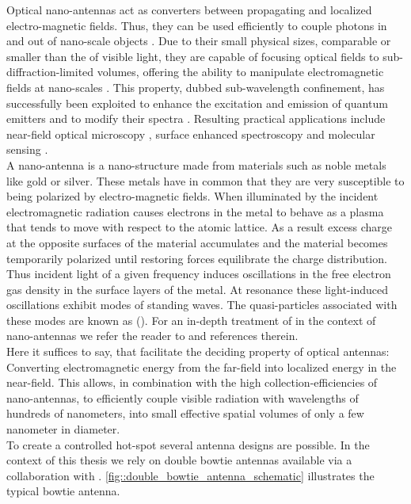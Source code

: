 		Optical nano-antennas act as converters between propagating and localized electro-magnetic fields. Thus, they can be used efficiently to couple photons in and out of nano-scale objects \cite{Curto2010}. Due to their small physical sizes, comparable or smaller than the \wl of visible light, they are capable of focusing optical fields to sub-diffraction-limited volumes, offering the ability to manipulate electromagnetic fields at nano-scales \cite{Curto2010::3, nancy::78}. This property, dubbed sub-wavelength confinement, has successfully been exploited to enhance the excitation and emission of quantum emitters \cite{Curto2010::4, Curto2010::5, Curto2010::6, Curto2010::7} and to modify their spectra \cite{Curto2010::8}. Resulting practical applications include near-field optical microscopy \cite{nancy::79}, surface enhanced spectroscopy \cite{nancy::80, nancy::81} and molecular sensing \cite{nancy::82}.
		\\
		A nano-antenna is a nano-structure made from materials such as noble metals like gold or silver. These metals have in common that they are very susceptible to being polarized by electro-magnetic fields. When illuminated by the incident electromagnetic radiation causes electrons in the metal to behave as a plasma that tends to move with respect to the atomic lattice. As a result excess charge at the opposite surfaces of the material accumulates and the material becomes temporarily polarized until restoring forces equilibrate the charge distribution.
		\\
		Thus incident light of a given frequency induces oscillations in the free electron gas density in the surface layers of the metal. At resonance these light-induced oscillations exhibit modes of standing waves. The quasi-particles associated with these modes are known as \lsps (\LSPs).
		For an in-depth treatment of \LSPs in the context of nano-antennas we refer the reader to \cite{nancy::thesis} and references therein.
		\\
		Here it suffices to say, that \LSPs facilitate the deciding property of optical antennas: Converting electromagnetic energy from the far-field into localized energy in the near-field. This allows, in combination with the high collection-efficiencies of nano-antennas, to efficiently couple visible radiation with wavelengths of hundreds of nanometers, into small effective spatial volumes of only a few nanometer in diameter.
		\\
		To create a controlled hot-spot several antenna designs are possible. In the context of this thesis we rely on double bowtie antennas available via a collaboration with \nancy. \cref{fig::double_bowtie_antenna_schematic} illustrates the typical bowtie antenna.

